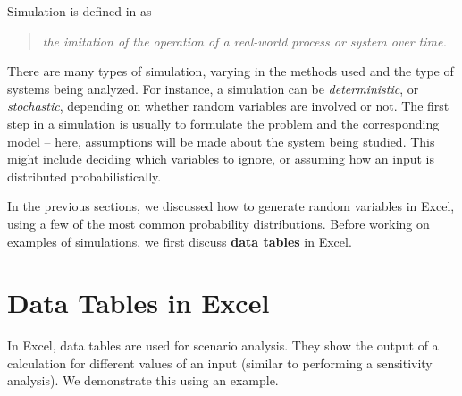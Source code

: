 Simulation is defined in \cite{banks2010} as \begin{quote} \emph{the imitation of the operation of a real-world process or system over time.} \end{quote}
There are many types of simulation, varying in the methods used and the type of systems being analyzed.
For instance, a simulation can be \emph{deterministic}, or \emph{stochastic}, depending on whether random variables are involved or not.
The first step in a simulation is usually to formulate the problem and the corresponding model -- here, assumptions will be made about the system being studied. 
This might include deciding which variables to ignore, or assuming how an input is distributed probabilistically.

In the previous sections, we discussed how to generate random variables in Excel, using a few of the most common probability distributions.
Before working on examples of simulations, we first discuss \textbf{data tables} in Excel.

\section{Data Tables in Excel}\label{sec3:datatable}

In Excel, data tables are used for scenario analysis.
They show the output of a calculation for different values of an input (similar to performing a sensitivity analysis).
We demonstrate this using an example.

